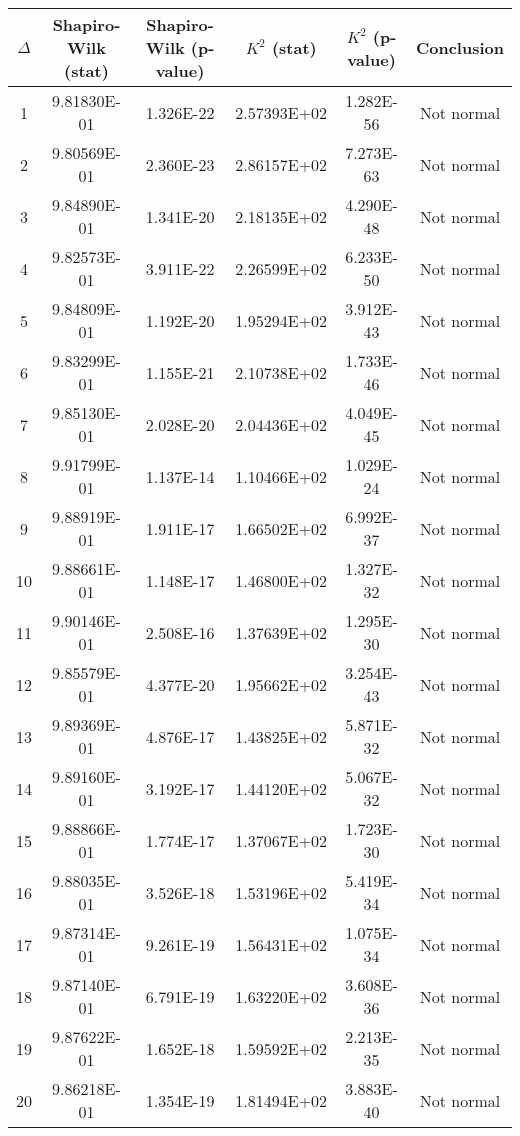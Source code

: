\begin{table}[h]
	\begin{tabular}{|c|c|c|c|c|c|}
		\hline
		$\Delta$ &  Shapiro-Wilk (stat) & Shapiro-Wilk (p-value) & $K^2$ (stat) & $K^2$ (p-value) & Conclusion\\\hline
		\hline
		1 & 9.81830E-01 & 1.326E-22 & 2.57393E+02 & 1.282E-56 & Not normal\\\hline
		2 & 9.80569E-01 & 2.360E-23 & 2.86157E+02 & 7.273E-63 & Not normal\\\hline
		3 & 9.84890E-01 & 1.341E-20 & 2.18135E+02 & 4.290E-48 & Not normal\\\hline
		4 & 9.82573E-01 & 3.911E-22 & 2.26599E+02 & 6.233E-50 & Not normal\\\hline
		5 & 9.84809E-01 & 1.192E-20 & 1.95294E+02 & 3.912E-43 & Not normal\\\hline
		6 & 9.83299E-01 & 1.155E-21 & 2.10738E+02 & 1.733E-46 & Not normal\\\hline
		7 & 9.85130E-01 & 2.028E-20 & 2.04436E+02 & 4.049E-45 & Not normal\\\hline
		8 & 9.91799E-01 & 1.137E-14 & 1.10466E+02 & 1.029E-24 & Not normal\\\hline
		9 & 9.88919E-01 & 1.911E-17 & 1.66502E+02 & 6.992E-37 & Not normal\\\hline
		10 & 9.88661E-01 & 1.148E-17 & 1.46800E+02 & 1.327E-32 & Not normal\\\hline
		11 & 9.90146E-01 & 2.508E-16 & 1.37639E+02 & 1.295E-30 & Not normal\\\hline
		12 & 9.85579E-01 & 4.377E-20 & 1.95662E+02 & 3.254E-43 & Not normal\\\hline
		13 & 9.89369E-01 & 4.876E-17 & 1.43825E+02 & 5.871E-32 & Not normal\\\hline
		14 & 9.89160E-01 & 3.192E-17 & 1.44120E+02 & 5.067E-32 & Not normal\\\hline
		15 & 9.88866E-01 & 1.774E-17 & 1.37067E+02 & 1.723E-30 & Not normal\\\hline
		16 & 9.88035E-01 & 3.526E-18 & 1.53196E+02 & 5.419E-34 & Not normal\\\hline
		17 & 9.87314E-01 & 9.261E-19 & 1.56431E+02 & 1.075E-34 & Not normal\\\hline
		18 & 9.87140E-01 & 6.791E-19 & 1.63220E+02 & 3.608E-36 & Not normal\\\hline
		19 & 9.87622E-01 & 1.652E-18 & 1.59592E+02 & 2.213E-35 & Not normal\\\hline
		20 & 9.86218E-01 & 1.354E-19 & 1.81494E+02 & 3.883E-40 & Not normal\\\hline

\end{tabular}
\end{table}
